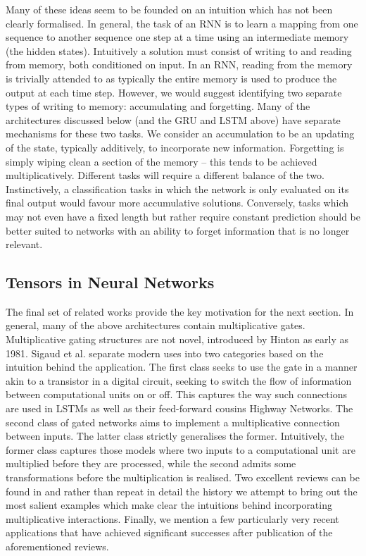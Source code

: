 Many of these ideas seem to be founded on an intuition which has not been clearly formalised. In
general, the task of an RNN is to learn a mapping from one sequence to another sequence one step at
a time using an intermediate memory (the hidden states). Intuitively a solution must consist of
writing to and reading from memory, both conditioned on input. In an RNN, reading from the memory is
trivially attended to as typically the entire memory is used to produce the output at each time
step. However, we would suggest identifying two separate types of writing to memory: accumulating
and forgetting. Many of the architectures discussed below (and the GRU and LSTM above) have separate
mechanisms for these two tasks. 
We consider an accumulation to be an updating of the state, typically additively, to incorporate
new information. Forgetting is simply wiping clean a section of the memory -- this tends to be
achieved multiplicatively. Different tasks will require a different balance of the two. Instinctively,
a classification tasks in which the network is only evaluated on its final output would favour
more accumulative solutions. Conversely, tasks which may not even have a fixed length but rather
require constant prediction should be better suited to networks with an ability to forget information
that is no longer relevant.

\subsection{Tensors in Neural Networks}
The final set of related works provide the key motivation for the next section. In general, many of
the above architectures contain multiplicative gates. Multiplicative gating structures are not novel,
introduced by Hinton as early as 1981. \autocite{Hinton1981} Sigaud et al. separate modern uses into
two categories based on the intuition behind the application. \autocite{Sigaud2015} The first class
seeks to use the gate in a manner akin to a transistor in a digital circuit, seeking to switch the
flow of information between computational units on or off. This captures the way such connections are
used in LSTMs as well as their feed-forward cousins Highway Networks. \autocite{Srivastava2015} The
second class of gated networks aims to implement a multiplicative connection between inputs. The
latter class strictly generalises the former. Intuitively, the former class captures those models
where two inputs to a computational unit are multiplied before they are processed, while the second
admits some transformations before the multiplication is realised. Two excellent reviews can be
found in \autocite{Memisevic2011, Sigaud2015} and rather than repeat in detail the history we
attempt to bring out the most salient examples which make clear the intuitions behind incorporating
multiplicative interactions. Finally, we mention a few particularly very recent applications
that have achieved significant successes after publication of the aforementioned reviews.

